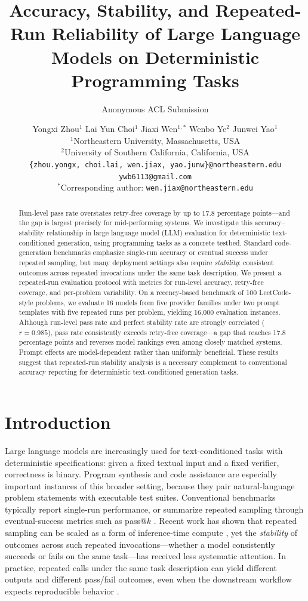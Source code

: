 \documentclass[11pt,a4paper]{article}
\title{Accuracy, Stability, and Repeated-Run Reliability of Large Language Models on Deterministic Programming Tasks}
\author{Anonymous ACL Submission}
\author{
  Yongxi Zhou$^{1}$ \quad Lai Yun Choi$^{1}$ \quad Jiaxi Wen$^{1,\ast}$ \quad Wenbo Ye$^{2}$ \quad Junwei Yao$^{1}$ \\
  $^{1}$Northeastern University, Massachusetts, USA \\
  $^{2}$University of Southern California, California, USA \\
  \texttt{\{zhou.yongx, choi.lai, wen.jiax, yao.junw\}@northeastern.edu} \quad
  \texttt{ywb6113@gmail.com} \\
  $^{\ast}$Corresponding author: \texttt{wen.jiax@northeastern.edu}
}
\begin{document}
\maketitle

\begin{abstract}
Run-level pass rate overstates retry-free coverage by up to 17.8 percentage points---and the gap is largest precisely for mid-performing systems. We investigate this accuracy--stability relationship in large language model (LLM) evaluation for deterministic text-conditioned generation, using programming tasks as a concrete testbed. Standard code-generation benchmarks emphasize single-run accuracy or eventual success under repeated sampling, but many deployment settings also require \emph{stability}: consistent outcomes across repeated invocations under the same task description. We present a repeated-run evaluation protocol with metrics for run-level accuracy, retry-free coverage, and per-problem variability. On a recency-based benchmark of 100 LeetCode-style problems, we evaluate 16 models from five provider families under two prompt templates with five repeated runs per problem, yielding 16{,}000 evaluation instances. Although run-level pass rate and perfect stability rate are strongly correlated ($r=0.985$), pass rate consistently exceeds retry-free coverage---a gap that reaches 17.8 percentage points and reverses model rankings even among closely matched systems. Prompt effects are model-dependent rather than uniformly beneficial. These results suggest that repeated-run stability analysis is a necessary complement to conventional accuracy reporting for deterministic text-conditioned generation tasks.
\end{abstract}

\section{Introduction}
Large language models are increasingly used for text-conditioned tasks with deterministic specifications: given a fixed textual input and a fixed verifier, correctness is binary. Program synthesis and code assistance are especially important instances of this broader setting, because they pair natural-language problem statements with executable test suites. Conventional benchmarks typically report single-run performance, or summarize repeated sampling through eventual-success metrics such as pass@$k$ \cite{chen2021codex,austin2021program}. Recent work has shown that repeated sampling can be scaled as a form of inference-time compute \cite{brown2024large}, yet the \emph{stability} of outcomes across such repeated invocations---whether a model consistently succeeds or fails on the same task---has received less systematic attention. In practice, repeated calls under the same task description can yield different outputs and different pass/fail outcomes, even when the downstream workflow expects reproducible behavior \cite{atil2024llm,alvarado2025repetitions}.
\end{document}
